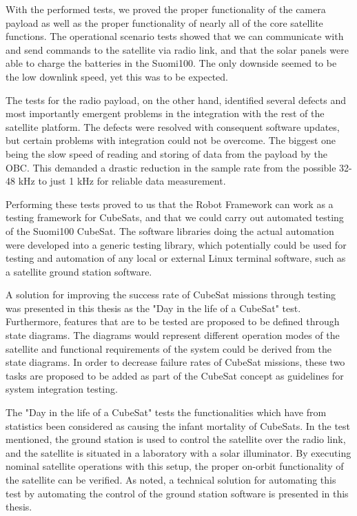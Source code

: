 \documentclass[english,12pt,a4paper,pdftex,elec,utf8]{aaltothesis}
\begin{document}
With the performed tests, we proved the proper functionality of the camera payload as well as the proper functionality of nearly all of the core satellite functions. The operational scenario tests showed that we can communicate with and send commands to the satellite via radio link, and that the solar panels were able to charge the batteries in the Suomi100. The only downside seemed to be the low downlink speed, yet this was to be expected.\par 
The tests for the radio payload, on the other hand, identified several defects and most importantly emergent problems in the integration with the rest of the satellite platform. The defects were resolved with consequent software updates, but certain problems with integration could not be overcome. The biggest one being the slow speed of reading and storing of data from the payload by the OBC. This demanded a drastic reduction in the sample rate from the possible 32-48 kHz to just 1 kHz for reliable data measurement.\par  
Performing these tests proved to us that the Robot Framework can work as a testing framework for CubeSats, and that we could carry out automated testing of the Suomi100 CubeSat. The software libraries doing the actual automation were developed into a generic testing library, which potentially could be used for testing and automation of any local or external Linux terminal software, such as a satellite ground station software.\par 
A solution for improving the success rate of CubeSat missions through testing was presented in this thesis as the "Day in the life of a CubeSat" test. Furthermore, features that are to be tested are proposed to be defined through state diagrams. The diagrams would represent different operation modes of the satellite and functional requirements of the system could be derived from the state diagrams. In order to decrease failure rates of CubeSat missions, these two tasks are proposed to be added as part of the CubeSat concept as guidelines for system integration testing. \par 
The "Day in the life of a CubeSat" tests the functionalities which have from statistics been considered as causing the infant mortality of CubeSats. In the test mentioned, the ground station is used to control the satellite over the radio link, and the satellite is situated in a laboratory with a solar illuminator. By executing nominal satellite operations with this setup, the proper on-orbit functionality of the satellite can be verified. As noted, a technical solution for automating this test by automating the control of the ground station software is presented in this thesis.
\end{document}
